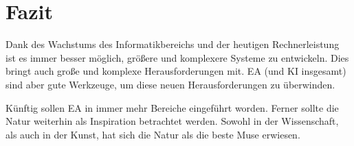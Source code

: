\documentclass[twoside,twocolumn]{article}
\begin{document}

\section{Fazit}
Dank des Wachstums des Informatikbereichs und der heutigen Rechnerleistung ist es immer besser möglich, größere und komplexere Systeme zu entwickeln. Dies bringt auch große und komplexe Herausforderungen mit. EA (und KI insgesamt) sind aber gute Werkzeuge, um diese neuen Herausforderungen zu überwinden.\par
Künftig sollen EA in immer mehr Bereiche eingeführt worden. Ferner sollte die Natur weiterhin als Inspiration betrachtet werden. Sowohl in der Wissenschaft, als auch in der Kunst, hat sich die Natur als die beste Muse erwiesen.


\renewcommand{\refname}{Quellenverzeichnis}




\end{document}
